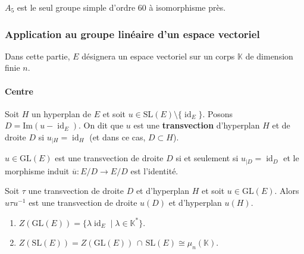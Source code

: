 
  \begin{application}
    $A_5$ est le seul groupe simple d'ordre $60$ à isomorphisme près.
  \end{application}

  \subsubsection{Application au groupe linéaire d'un espace vectoriel}

  Dans cette partie, $E$ désignera un espace vectoriel sur un corps $\mathbb{K}$ de dimension finie $n$.

  \paragraph{Centre}


  \begin{definition}
    Soit $H$ un hyperplan de $E$ et soit $u \in \mathrm{SL}(E) \setminus \{ \operatorname{id}_E \}$. Posons $D = \mathrm{Im}(u - \operatorname{id}_E)$. On dit que $u$ est une \textbf{transvection} d'hyperplan $H$ et de droite $D$ si $u_{|H} = \operatorname{id}_H$ (et dans ce cas, $D \subset H$).
  \end{definition}

  \begin{proposition}
    $u \in \mathrm{GL}(E)$ est une transvection de droite $D$ si et seulement si $u_{|D} = \operatorname{id}_D$ et le morphisme induit $\overline{u} : E/D \rightarrow E/D$ est l'identité.
  \end{proposition}

  \begin{proposition}
    Soit $\tau$ une transvection de droite $D$ et d'hyperplan $H$ et soit $u \in \mathrm{GL}(E)$. Alors $u \tau u^{-1}$ est une transvection de droite $u(D)$ et d'hyperplan $u(H)$.
  \end{proposition}

  \begin{corollary}
    \begin{enumerate}[label=(\roman*)]
      \item $Z(\mathrm{GL}(E)) = \{ \lambda \operatorname{id}_E \mid \lambda \in \mathbb{K}^* \}$.
      \item $Z(\mathrm{SL}(E)) = Z(\mathrm{GL}(E)) \, \cap \, \mathrm{SL}(E) \cong \mu_n(\mathbb{K})$.
    \end{enumerate}
  \end{corollary}

